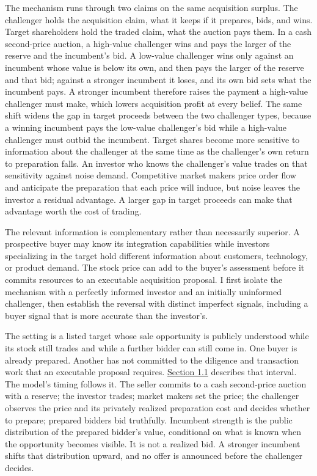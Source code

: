 \documentclass[
  12pt,
]{article}
\begin{document}
The mechanism runs through two claims on the same acquisition surplus.
The challenger holds the acquisition claim, what it keeps if it
prepares, bids, and wins. Target shareholders hold the traded claim,
what the auction pays them. In a cash second-price auction, a high-value
challenger wins and pays the larger of the reserve and the incumbent's
bid. A low-value challenger wins only against an incumbent whose value
is below its own, and then pays the larger of the reserve and that bid;
against a stronger incumbent it loses, and its own bid sets what the
incumbent pays. A stronger incumbent therefore raises the payment a
high-value challenger must make, which lowers acquisition profit at
every belief. The same shift widens the gap in target proceeds between
the two challenger types, because a winning incumbent pays the low-value
challenger's bid while a high-value challenger must outbid the
incumbent. Target shares become more sensitive to information about the
challenger at the same time as the challenger's own return to
preparation falls. An investor who knows the challenger's value trades
on that sensitivity against noise demand. Competitive market makers
price order flow and anticipate the preparation that each price will
induce, but noise leaves the investor a residual advantage. A larger gap
in target proceeds can make that advantage worth the cost of trading.

The relevant information is complementary rather than necessarily
superior. A prospective buyer may know its integration capabilities
while investors specializing in the target hold different information
about customers, technology, or product demand. The stock price can add
to the buyer's assessment before it commits resources to an executable
acquisition proposal. I first isolate the mechanism with a perfectly
informed investor and an initially uninformed challenger, then establish
the reversal with distinct imperfect signals, including a buyer signal
that is more accurate than the investor's.

The setting is a listed target whose sale opportunity is publicly
understood while its stock still trades and while a further bidder can
still come in. One buyer is already prepared. Another has not committed
to the diligence and transaction work that an executable proposal
requires. \hyperref[sec-the-decision-interval]{Section 1.1} describes
that interval. The model's timing follows it. The seller commits to a
cash second-price auction with a reserve; the investor trades; market
makers set the price; the challenger observes the price and its
privately realized preparation cost and decides whether to prepare;
prepared bidders bid truthfully. Incumbent strength is the public
distribution of the prepared bidder's value, conditional on what is
known when the opportunity becomes visible. It is not a realized bid. A
stronger incumbent shifts that distribution upward, and no offer is
announced before the challenger decides.
\end{document}
